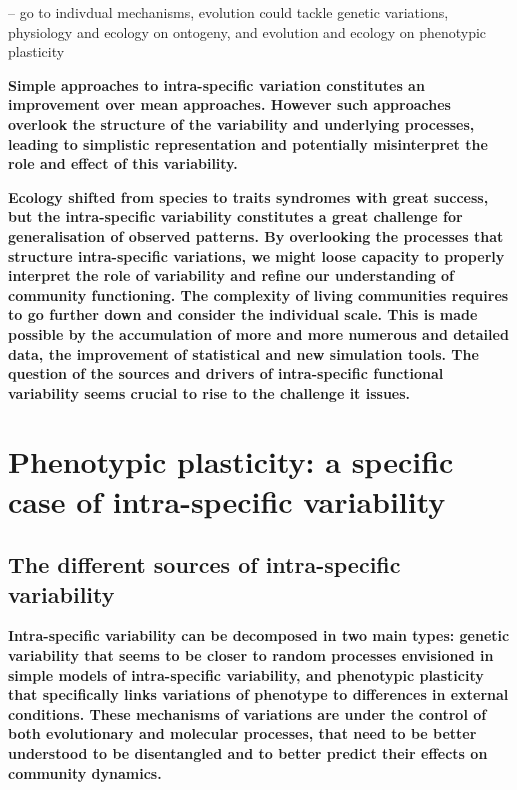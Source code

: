 -- go to indivdual mechanisms, evolution could tackle genetic variations, physiology and ecology on ontogeny, and evolution and ecology on phenotypic plasticity


\textbf{Simple approaches to intra-specific variation constitutes an improvement over mean approaches. However such approaches overlook the structure of the variability and underlying processes, leading to simplistic representation and potentially misinterpret the role and effect of this variability.}


\textbf{%
Ecology shifted from species to traits syndromes with great success, but the intra-specific variability constitutes a great challenge for generalisation of observed patterns. By overlooking the processes that structure intra-specific variations, we might loose capacity to properly interpret the role of variability and refine our understanding of community functioning. The complexity of living communities requires to go further down and consider the individual scale. This is made possible by the accumulation of more and more numerous and detailed data, the improvement of statistical and new simulation tools. The question of the sources and drivers of intra-specific functional variability seems crucial to rise to the challenge it issues.}



\section{Phenotypic plasticity: a specific case of intra-specific variability}

\subsection{The different sources of intra-specific variability}


\textbf{Intra-specific variability can be decomposed in two main types: genetic variability that seems to be closer to random processes envisioned in simple models of intra-specific variability, and phenotypic plasticity that specifically links variations of phenotype to differences in external conditions. These mechanisms of variations are under the control of both evolutionary and molecular processes, that need to be better understood to be disentangled and to better predict their effects on community dynamics.}


